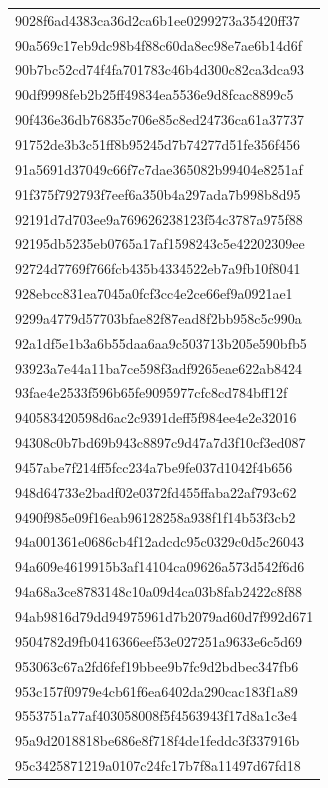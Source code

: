 \begin{tabular}{l}
9028f6ad4383ca36d2ca6b1ee0299273a35420ff37 \\
90a569c17eb9dc98b4f88c60da8ec98e7ae6b14d6f \\
90b7bc52cd74f4fa701783c46b4d300c82ca3dca93 \\
90df9998feb2b25ff49834ea5536e9d8fcac8899c5 \\
90f436e36db76835c706e85c8ed24736ca61a37737 \\
91752de3b3c51ff8b95245d7b74277d51fe356f456 \\
91a5691d37049c66f7c7dae365082b99404e8251af \\
91f375f792793f7eef6a350b4a297ada7b998b8d95 \\
92191d7d703ee9a769626238123f54c3787a975f88 \\
92195db5235eb0765a17af1598243c5e42202309ee \\
92724d7769f766fcb435b4334522eb7a9fb10f8041 \\
928ebcc831ea7045a0fcf3cc4e2ce66ef9a0921ae1 \\
9299a4779d57703bfae82f87ead8f2bb958c5c990a \\
92a1df5e1b3a6b55daa6aa9c503713b205e590bfb5 \\
93923a7e44a11ba7ce598f3adf9265eae622ab8424 \\
93fae4e2533f596b65fe9095977cfc8cd784bff12f \\
940583420598d6ac2c9391deff5f984ee4e2e32016 \\
94308c0b7bd69b943c8897c9d47a7d3f10cf3ed087 \\
9457abe7f214ff5fcc234a7be9fe037d1042f4b656 \\
948d64733e2badf02e0372fd455ffaba22af793c62 \\
9490f985e09f16eab96128258a938f1f14b53f3cb2 \\
94a001361e0686cb4f12adcdc95c0329c0d5c26043 \\
94a609e4619915b3af14104ca09626a573d542f6d6 \\
94a68a3ce8783148c10a09d4ca03b8fab2422c8f88 \\
94ab9816d79dd94975961d7b2079ad60d7f992d671 \\
9504782d9fb0416366eef53e027251a9633e6c5d69 \\
953063c67a2fd6fef19bbee9b7fc9d2bdbec347fb6 \\
953c157f0979e4cb61f6ea6402da290cac183f1a89 \\
9553751a77af403058008f5f4563943f17d8a1c3e4 \\
95a9d2018818be686e8f718f4de1feddc3f337916b \\
95c3425871219a0107c24fc17b7f8a11497d67fd18 \\

\end{tabular}
